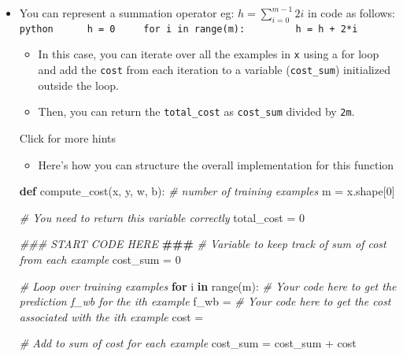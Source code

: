 \documentclass[11pt]{article}
\providecommand{\tightlist}{%
      \setlength{\itemsep}{0pt}\setlength{\parskip}{0pt}}
\newenvironment{Shaded}{}{}
\newcommand{\KeywordTok}[1]{\textcolor[rgb]{0.00,0.44,0.13}{\textbf{{#1}}}}
\newcommand{\DecValTok}[1]{\textcolor[rgb]{0.25,0.63,0.44}{{#1}}}
\newcommand{\CommentTok}[1]{\textcolor[rgb]{0.38,0.63,0.69}{\textit{{#1}}}}
\newcommand{\AlertTok}[1]{\textcolor[rgb]{1.00,0.00,0.00}{\textbf{{#1}}}}
\newcommand{\NormalTok}[1]{{#1}}
\newcommand{\ControlFlowTok}[1]{\textcolor[rgb]{0.00,0.44,0.13}{\textbf{{#1}}}}
\newcommand{\OperatorTok}[1]{\textcolor[rgb]{0.40,0.40,0.40}{{#1}}}
\newcommand{\BuiltInTok}[1]{{#1}}
\begin{document}
\begin{itemize}
\item
  You can represent a summation operator eg:
  \(h = \sum\limits_{i = 0}^{m-1} 2i\) in code as follows:
  \texttt{python\ \ \ \ \ \ h\ =\ 0\ \ \ \ \ for\ i\ in\ range(m):\ \ \ \ \ \ \ \ \ h\ =\ h\ +\ 2*i}

  \begin{itemize}
  \item
    In this case, you can iterate over all the examples in \texttt{x}
    using a for loop and add the \texttt{cost} from each iteration to a
    variable (\texttt{cost\_sum}) initialized outside the loop.
  \item
    Then, you can return the \texttt{total\_cost} as \texttt{cost\_sum}
    divided by \texttt{2m}.
  \end{itemize}

  Click for more hints

  \begin{itemize}
  \tightlist
  \item
    Here's how you can structure the overall implementation for this
    function
  \end{itemize}

\begin{Shaded}
\begin{Highlighting}[]
 \KeywordTok{def}\NormalTok{ compute\_cost(x, y, w, b):}
     \CommentTok{\# number of training examples}
\NormalTok{     m }\OperatorTok{=}\NormalTok{ x.shape[}\DecValTok{0}\NormalTok{] }

     \CommentTok{\# You need to return this variable correctly}
\NormalTok{     total\_cost }\OperatorTok{=} \DecValTok{0}

     \CommentTok{\#\#\# START CODE HERE }\AlertTok{\#\#\#}\CommentTok{  }
     \CommentTok{\# Variable to keep track of sum of cost from each example}
\NormalTok{     cost\_sum }\OperatorTok{=} \DecValTok{0}

     \CommentTok{\# Loop over training examples}
     \ControlFlowTok{for}\NormalTok{ i }\KeywordTok{in} \BuiltInTok{range}\NormalTok{(m):}
         \CommentTok{\# Your code here to get the prediction f\_wb for the ith example}
\NormalTok{         f\_wb }\OperatorTok{=} 
         \CommentTok{\# Your code here to get the cost associated with the ith example}
\NormalTok{         cost }\OperatorTok{=} 

         \CommentTok{\# Add to sum of cost for each example}
\NormalTok{         cost\_sum }\OperatorTok{=}\NormalTok{ cost\_sum }\OperatorTok{+}\NormalTok{ cost }


\end{Highlighting}
\end{Shaded}
\end{itemize}
\end{document}
